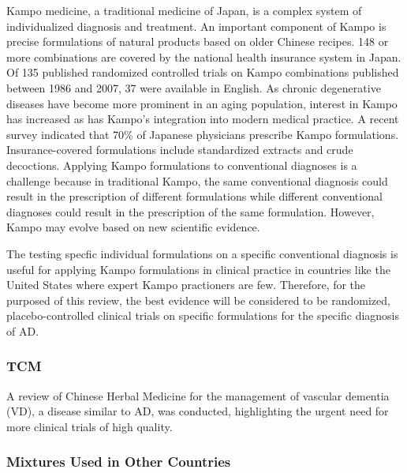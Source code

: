 \documentclass[twocolumn]{article}
\begin{document}
Kampo medicine, a traditional medicine of Japan,
is a complex system of individualized diagnosis and treatment.
An important component of Kampo is precise formulations of natural products
based on older Chinese recipes.
148 or more combinations are covered by the national health insurance system in Japan.
Of 135 published randomized controlled trials on Kampo combinations
published between 1986 and 2007,
37 were available in English.
As chronic degenerative diseases have become more prominent in an aging population,
interest in Kampo has increased as has Kampo's integration into modern medical practice.
A recent survey indicated that 70\% of Japanese physicians prescribe Kampo formulations.
Insurance-covered formulations include standardized extracts and crude decoctions.
Applying Kampo formulations to conventional diagnoses is a challenge because
in traditional Kampo, the same conventional diagnosis could result in the prescription
of different formulations while different conventional diagnoses could result
in the prescription of the same formulation.
\cite{watanabe2011traditional}
However, Kampo may evolve based on new scientific evidence.
\cite{terasawa2004evidence}

The testing specfic individual formulations on a specific conventional diagnosis
is useful for applying Kampo formulations in clinical practice in
countries like the United States where expert Kampo practioners are few.
Therefore, for the purposed of this review, the best evidence will be considered
to be randomized, placebo-controlled clinical trials on specific formulations
for the specific diagnosis of AD.

\subsubsection{TCM}

A review of Chinese Herbal Medicine for the management of vascular dementia (VD),
a disease similar to AD,
was conducted, highlighting the urgent need for more clinical trials of high quality.
\cite{liu2008development}

\subsubsection{Mixtures Used in Other Countries}
\end{document}
